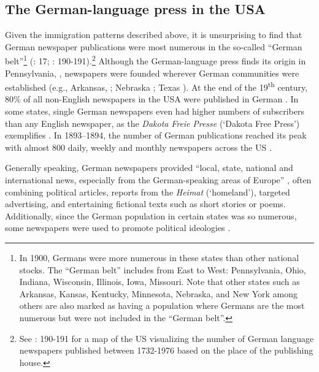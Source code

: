 \documentclass[output=paper]{langsci/langscibook}
\begin{document}
\subsection{The German-language press in the USA} %
\label{sec:rocker:2.2}

Given the immigration patterns described above, it is unsurprising to find that German newspaper publications were most numerous in the so-called “German belt”\footnote{In 1900, Germans were more numerous in these states than other national stocks. The “German belt” includes from East to West: Pennsylvania, Ohio, Indiana, Wisconsin, Illinois, Iowa, Missouri. Note that other states such as Arkansas, Kansas, Kentucky, Minnesota, Nebraska, and New York among others are also marked as having a population where Germans are the most numerous but were not included in the “German belt”.} (\citealt{Schwartzkopff1987}: 17; \citealt{Dolmetsch1976}: 190-191).\footnote{See \citealt{Dolmetsch1976}: 190-191 for a map of the US visualizing the number of German language newspapers published between 1732-1976 based on the place of the publishing house.} Although the German-language press finds its origin in Pennsylvania, \citep[192]{Dolmetsch1976}, newspapers were founded wherever German communities were established (e.g., Arkansas, \citealt{Condray2015}; Nebraska \citealt{Schach1984}; Texas \citealt{Etzler1954}). At the end of the 19\textsuperscript{th} century, 80\% of all non-English newspapers in the USA were published in German \citep[187]{Dolmetsch1976}. In some states, single German newspapers even had higher numbers of subscribers than any English newspaper, as the \textit{Dakota} \textit{Freie} \textit{Presse} (‘Dakota Free Press’) exemplifies \citep[84]{Schach1984}. In 1893--1894, the number of German publications reached its peak with almost 800 daily, weekly and monthly newspapers across the US \citep[208]{Wittke1973}.

Generally speaking, German newspapers provided “local, state, national and international news, especially from the German-speaking areas of Europe” \citep[91]{Schach1984}, often combining political articles, reports from the \textit{Heimat} (‘homeland’), targeted advertising, and entertaining fictional texts such as short stories or poems. Additionally, since the German population in certain states was so numerous, some newspapers were used to promote political ideologies \citep[188]{Dolmetsch1976}. 
\end{document}
